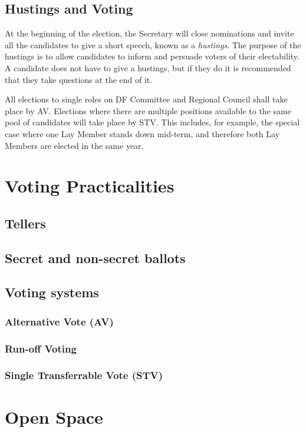 \documentclass[a4paper, 12pt]{article} %
\begin{document}
\subsection{Hustings and Voting}
At the beginning of the election, the Secretary will close nominations and invite all the candidates to give a short speech, known as a \emph{hustings}.  The purpose of the hustings is to allow candidates to inform and persuade voters of their electability.  A candidate does not have to give a hustings, but if they do it is recommended that they take questions at the end of it.

All elections to single roles on DF Committee and Regional Council shall take place by AV.  Elections where there are multiple positions available to the same pool of candidates will take place by STV.  This includes, for example, the special case where one Lay Member stands down mid-term, and therefore both Lay Members are elected in the same year.

\section{Voting Practicalities}
\subsection{Tellers}
\subsection{Secret and non-secret ballots}
\subsection{Voting systems}
\subsubsection{Alternative Vote (AV)}
\label{sec:av}
\subsubsection{Run-off Voting}
\subsubsection{Single Transferrable Vote (STV)}

\appendix

\section{Open Space}
\label{sec:openspace}
\end{document}
